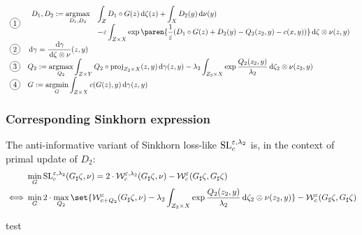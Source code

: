 \documentclass[11pt,a4paper]{article}
\begin{document}
\begin{equation}
    \label{eqn:algo-1-anti-info-rotgan}
    \begin{array}{c>{\displaystyle}l}
        \circled {1} &
        \begin{array}{*2{>{\displaystyle}l}}
            D_1, D_2 \assign \argmax_{D_1, D_2} & \int_{Z} {D_1 \circ G(z) \d \zeta(z)} + \int_{X}{D_2(y) \d
            \nu(y)} \\
              & - \eps \int_{\ZX}{\exp{\paren{ \frac{1}{\eps}(D_1 \circ G(z) + D_2 (y) - Q_2(z_2, y) - c(x, y)) }} \d \zetaxnu(z, y)}
        \end{array} \\
        \circled{2}& \d \gamma = \radon{\gamma}{\zetaxnu}(z, y) \\
        \circled{3}& Q_2 \assign \argmax_{Q_2} \int_{\ZY}{ Q_2 \circ \projZBX(z, y)}\d \gamma(z, y)   - \lambda_2 \int_{\ZBX}{\exp{\frac{Q_2(z_2, y)}{\lambda_2}} \d \oprod{\zeta_2}{\nu}(z_2, y)}\\
        \circled{4}& G \assign \argmin_{G} \int_{\ZX}c(G(z), y) \d \gamma(z, y)
    \end{array}
\end{equation}

\subsubsection{Corresponding Sinkhorn expression}

The anti-informative variant of Sinkhorn loss-like $\mathrm{SL}_{c}^{\varepsilon, \lambda_2}$ is, in the context of primal update of $D_2$:
\begin{align}
    &\min_{G} \SLace(\pf{G}{\zeta}, \nu) = 2 \cdot \Wace(\pf{G}{\zeta}, \nu) - \Wce(\pf{G}{\zeta}, \pf{G}{\zeta}) \\%
    \iff &\min_{G} 2 \cdot \max_{Q_2}\set{ \W_{c + Q_2}^{\eps}(\pf{G}{\zeta}, \nu)- \lambda_2 \int_{\ZBX}{\exp{\frac{Q_2(z_2, y)}{\lambda_2}} \d \oprod{\zeta_2 }{\nu (z_2, y)}}} - \Wce(\pf{G}{\zeta}, \pf{G}{\zeta}) \label{eqn:rem-c-q_2}
\end{align}

test


\end{document}
